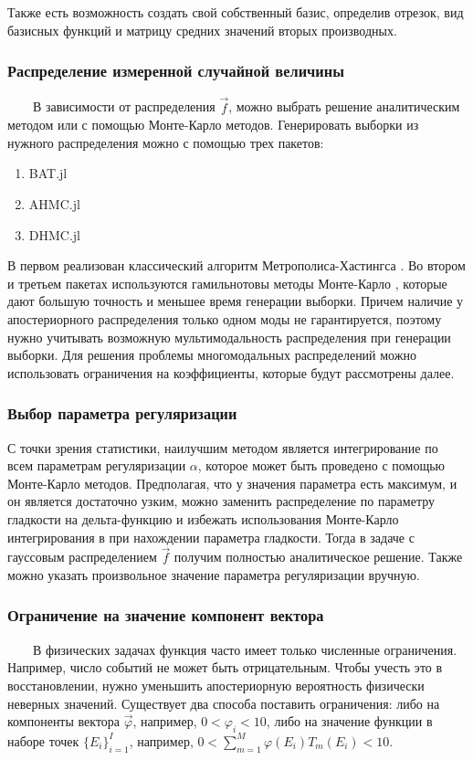\documentclass{config}
\begin{document}
Также есть возможность создать свой собственный базис, определив отрезок, вид базисных функций и матрицу средних значений вторых производных.

\subsubsection{Распределение измеренной случайной величины}
~~~~В зависимости от распределения $\vec{f}$, можно выбрать решение аналитическим методом или с помощью Монте-Карло методов. Генерировать выборки из нужного распределения можно с помощью трех пакетов:
\begin{enumerate}
    \item BAT.jl
    \item AHMC.jl
    \item DHMC.jl
\end{enumerate}
В первом реализован классический алгоритм Метрополиса-Хастингса \cite{metropolis}. Во втором и третьем пакетах используются гамильнотовы методы Монте-Карло \cite{hamiltonian_mc}, которые дают большую точность и меньшее время генерации выборки. Причем наличие у апостериорного распределения только одном моды не гарантируется, поэтому нужно учитывать возможную мультимодальность распределения при генерации выборки. Для решения проблемы многомодальных распределений можно использовать ограничения на коэффициенты, которые будут рассмотрены далее.

\subsubsection{Выбор параметра регуляризации}
С точки зрения статистики, наилучшим методом является интегрирование по всем параметрам регуляризации $\alpha$, которое может быть проведено с помощью Монте-Карло методов. Предполагая, что у значения параметра есть максимум, и он является достаточно узким, можно заменить распределение по параметру гладкости на дельта-функцию и избежать использования Монте-Карло интегрирования в при нахождении параметра гладкости. Тогда в задаче с гауссовым распределением $\vec{f}$ получим полностью аналитическое решение. Также можно указать произвольное значение параметра регуляризации вручную.

\subsubsection{Ограничение на значение компонент вектора}
~~~~В физических задачах функция часто имеет только численные ограничения. Например, число событий не может быть отрицательным. Чтобы учесть это в восстановлении, нужно уменьшить апостериорную вероятность физически неверных значений. Существует два способа поставить ограничения: либо на компоненты вектора $\vec{\varphi}$, например, $0 < \varphi_i < 10$, либо на значение функции в наборе точек $\{E_i\}_{i=1}^I$, например, $0 < \sum_{m=1}^M \varphi(E_i) T_m(E_i) < 10$.
\end{document}
